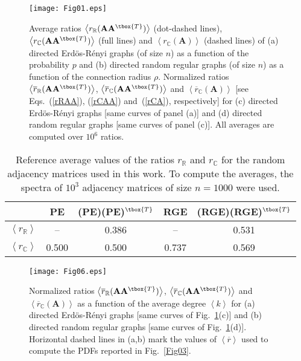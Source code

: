 \begin{figure}[t]
\centering
\texttt{[image: Fig01.eps]}
\caption{Average ratios 
$\left\langle r_\mathbb{R}(\mathbf{A}\mathbf{A}^{\tbox{T}}) \right\rangle$ (dot-dashed lines), 
$\left\langle r_\mathbb{C}(\mathbf{A}\mathbf{A}^{\tbox{T}}) \right\rangle$ (full lines) 
and $\left\langle r_\mathbb{C}(\mathbf{A}) \right\rangle$ (dashed lines) of 
(a) directed Erd\"os-R\'enyi graphs (of size $n$) as a function of the probability $p$ and
(b) directed random regular graphs (of size $n$) as a function of the connection radius $\rho$.
Normalized ratios $\left\langle \overline{r}_\mathbb{R}(\mathbf{A}\mathbf{A}^{\tbox{T}}) \right\rangle$, 
$\left\langle \overline{r}_\mathbb{C}(\mathbf{A}\mathbf{A}^{\tbox{T}}) \right\rangle$ and
$\left\langle \overline{r}_\mathbb{C}(\mathbf{A}) \right\rangle$
[see Eqs.~(\ref{rRAA}), (\ref{rCAA}) and~(\ref{rCA}), respectively] for
(c) directed Erd\"os-R\'enyi graphs [same curves of panel (a)] and
(d) directed random regular graphs [same curves of panel (c)].
All averages are computed over $10^6$ ratios.}
\label{Fig01}
\end{figure}
\setlength{\tabcolsep}{6pt}
\begin{table}[b!]
\caption{Reference average values of the ratios $r_\mathbb{R}$ and $r_\mathbb{C}$ for the random 
adjacency matrices used in this work. To compute the averages, the spectra of $10^3$ adjacency 
matrices of size $n=1000$ were used.}
\label{T1}
\begin{tabular}{ c | c | c | c | c  }  
\hline
 & PE & (PE)(PE)$^{\tbox{T}}$ & RGE & (RGE)(RGE)$^{\tbox{T}}$  \\
\hline
$\left\langle r_\mathbb{R} \right\rangle$ 
& -- & 0.386 & -- & 0.531  \\
$\left\langle r_\mathbb{C} \right\rangle$  
& 0.500 & 0.500 & 0.737 & 0.569 \\
\hline
\end{tabular}
\end{table}
\begin{figure}[t]
\centering
\texttt{[image: Fig06.eps]}
\caption{
Normalized ratios $\left\langle \overline{r}_\mathbb{R}(\mathbf{A}\mathbf{A}^{\tbox{T}}) \right\rangle$, 
$\left\langle \overline{r}_\mathbb{C}(\mathbf{A}\mathbf{A}^{\tbox{T}}) \right\rangle$ and
$\left\langle \overline{r}_\mathbb{C}(\mathbf{A}) \right\rangle$ as a function of the average degree
$\left\langle k \right\rangle$ for
(a) directed Erd\"os-R\'enyi graphs [same curves of Fig.~\ref{Fig01}(c)] and
(b) directed random regular graphs [same curves of Fig.~\ref{Fig01}(d)].
Horizontal dashed lines in (a,b) mark the values of $\left\langle \overline{r} \right\rangle$ 
used to compute the PDFs reported in Fig.~\ref{Fig03}.}
\label{Fig06}
\end{figure}



